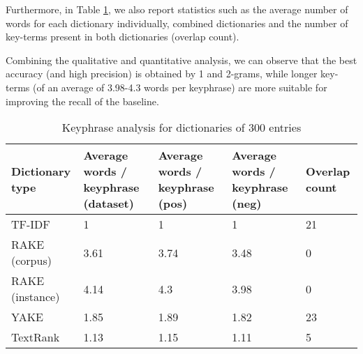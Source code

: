 Furthermore, in Table \ref{tab:stats}, we also report statistics such as the average number of words for each dictionary individually, combined dictionaries and the number of key-terms present in both dictionaries (overlap count). 

Combining the qualitative and quantitative analysis, we can observe that the best accuracy (and high precision) is obtained by 1 and 2-grams, while longer key-terms (of an average of 3.98-4.3 words per keyphrase) are more suitable for improving the recall of the baseline.

    \begin{table}[H]%
        \centering
        \begin{tabular}{|p{3cm}|p{3cm}|p{3cm}|p{3cm}|p{1.5cm}|}
        \hline
        Dictionary type& Average words / keyphrase (dataset)& Average words / keyphrase (pos) &Average words / keyphrase (neg) & Overlap count\\\hline
        
        TF-IDF &1&1&1&21\\ \hline
        RAKE (corpus)&3.61&3.74&3.48&0\\ \hline
        RAKE (instance)&4.14&4.3&3.98&0\\ \hline
        YAKE&1.85&1.89&1.82&23\\ \hline
        TextRank&1.13&1.15&1.11&5\\ \hline
        
        
        \end{tabular}
        \caption{Keyphrase analysis for dictionaries of 300 entries}
        \label{tab:stats}
    \end{table}

